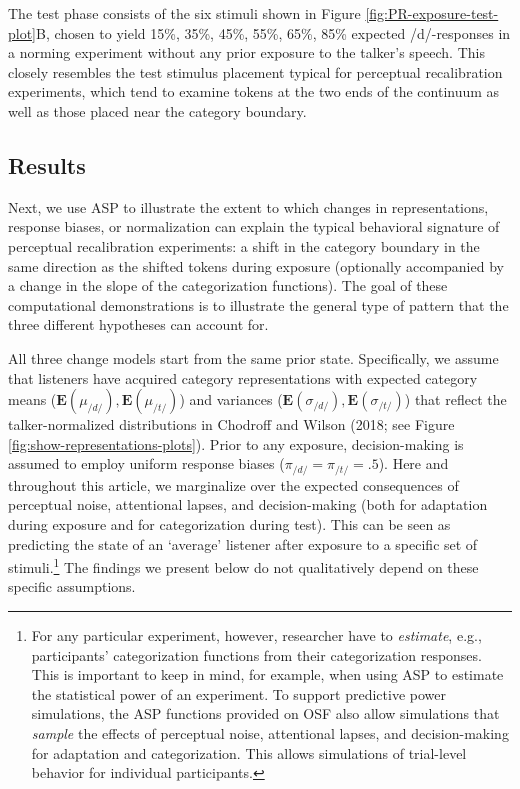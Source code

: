 \documentclass[
  11pt,
  man,floatsintext]{apa6}
\begin{document}
The test phase consists of the six stimuli shown in Figure \ref{fig:PR-exposure-test-plot}B, chosen to yield 15\%, 35\%, 45\%, 55\%, 65\%, 85\% expected /d/-responses in a norming experiment without any prior exposure to the talker's speech. This closely resembles the test stimulus placement typical for perceptual recalibration experiments, which tend to examine tokens at the two ends of the continuum as well as those placed near the category boundary.

\hypertarget{results}{%
\subsection{Results}\label{results}}

Next, we use ASP to illustrate the extent to which changes in representations, response biases, or normalization can explain the typical behavioral signature of perceptual recalibration experiments: a shift in the category boundary in the same direction as the shifted tokens during exposure (optionally accompanied by a change in the slope of the categorization functions). The goal of these computational demonstrations is to illustrate the general type of pattern that the three different hypotheses can account for.

All three change models start from the same prior state. Specifically, we assume that listeners have acquired category representations with expected category means (\(\mathbf{E}(\mu_{/d/}), \mathbf{E}(\mu_{/t/})\)) and variances (\(\mathbf{E}(\sigma_{/d/}), \mathbf{E}(\sigma_{/t/})\)) that reflect the talker-normalized distributions in Chodroff and Wilson (2018; see Figure \ref{fig:show-representations-plots}). Prior to any exposure, decision-making is assumed to employ uniform response biases (\(\pi_{/d/}=\pi_{/t/}=.5\)). Here and throughout this article, we marginalize over the expected consequences of perceptual noise, attentional lapses, and decision-making (both for adaptation during exposure and for categorization during test). This can be seen as predicting the state of an `average' listener after exposure to a specific set of stimuli.\footnote{For any particular experiment, however, researcher have to \emph{estimate}, e.g., participants' categorization functions from their categorization responses. This is important to keep in mind, for example, when using ASP to estimate the statistical power of an experiment. To support predictive power simulations, the ASP functions provided on OSF also allow simulations that \emph{sample} the effects of perceptual noise, attentional lapses, and decision-making for adaptation and categorization. This allows simulations of trial-level behavior for individual participants.} The findings we present below do not qualitatively depend on these specific assumptions.
\end{document}
